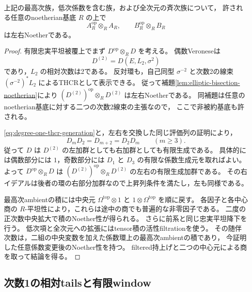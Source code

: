 \begin{corollary}\label{cor:degree-one-product-noetherian}
上記の最高次族，低次係数を含む族，および全次元の斉次族について，
許される任意のnoetherian基底 $R$ の上で
\[
 A_R^{\mathrm{op}}\otimes_R A_R,\qquad
 B_R^{\mathrm{op}}\otimes_R B_R
\]
は左右Noetherである。
\end{corollary}
\begin{proof}
有限忠実平坦被覆上でまず $D^{\mathrm{op}}\otimes_R D$ を考える。
偶数Veroneseは
\[
 D^{(2)}=D(E,L_2,\sigma^2)
\]
であり，$L_2$ の相対次数は2である。
反対環も，自己同型 $\sigma^{-2}$ と次数2の線束
$(\sigma^{-2})^*L_2$ によるTHCRとして表示できる。
従って補題\ref{lem:elliptic-bisection-noetherian}により
$(D^{(2)})^{\mathrm{op}}\otimes_R D^{(2)}$ は左右Noetherである。
同補題は任意のnoetherian基底に対する二つの次数2線束の主張なので，
ここで非被約基底も許される。

\eqref{eq:degree-one-thcr-generation}と，左右を交換した同じ評価列の証明により，
\[
 D_mD_2=D_{m+2}=D_2D_m\qquad(m\ge3).
\]
従って $D$ は $D^{(2)}$ の左加群としても右加群としても有限生成である。
具体的には偶数部分には $1$，奇数部分には $D_1$ と $D_3$ の有限な係数生成元を取ればよい。
よって $D^{\mathrm{op}}\otimes_R D$ は
$(D^{(2)})^{\mathrm{op}}\otimes_R D^{(2)}$ の左右の有限生成加群である。
その右イデアルは後者の環の右部分加群なので上昇列条件を満たし，左も同様である。

最高次ambientの積には中央元
$\Omega^{\mathrm{top}}\otimes1$ と $1\otimes\Omega^{\mathrm{top}}$ を順に戻す。
各因子と各中心商の $R$-平坦性により，これらは途中の商でも普遍的な非零因子である。
二度の正次数中央拡大で積のNoether性が得られる。
さらに前系と同じ忠実平坦降下を行う。
低次項と全次元への拡張にはtensor積の活性filtrationを使う。
その随伴次数は，二組の中央変数を加えた係数環上の最高次ambientの積であり，
今証明した任意係数変更後のNoether性を持つ。
filtered持上げと二つの中心元による商を取って結論を得る。
\end{proof}

\subsection{次数1の相対tailsと有限window}

